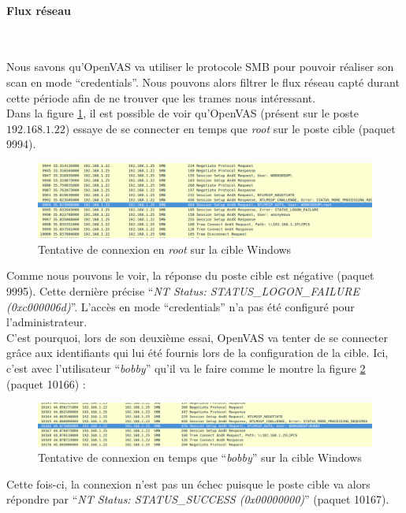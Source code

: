 \paragraph{Flux réseau}~\\\par
Nous savons qu'OpenVAS va utiliser le protocole SMB pour pouvoir réaliser son scan en mode \enquote{credentials}. Nous pouvons alors filtrer le flux réseau capté durant cette période afin de ne trouver que les trames nous intéressant.\\
Dans la figure \ref{fig:1}, il est possible de voir qu'OpenVAS (présent sur le poste $192.168.1.22$) essaye de se connecter en temps que \textit{root} sur le poste cible (paquet 9994).
\begin{figure}[H]
    \centering
    \includegraphics[width=\textwidth]{img/ws1.png}
    \caption{Tentative de connexion en \textit{root} sur la cible Windows}
    \label{fig:1}
\end{figure}
Comme nous pouvons le voir, la réponse du poste cible est négative (paquet 9995). Cette dernière précise \enquote{\textit{NT Status: STATUS\_LOGON\_FAILURE (0xc000006d)}}. L'accès en mode \enquote{credentials} n'a pas été configuré pour l'administrateur.\\
C'est pourquoi, lors de son deuxième essai, OpenVAS va tenter de se connecter grâce aux identifiants qui lui été fournis lors de la configuration de la cible. Ici, c'est avec l'utilisateur \enquote{\textit{bobby}} qu'il va le faire comme le montre la figure \ref{fig:2} (paquet 10166) :
\begin{figure}[H]
    \centering
    \includegraphics[width=\textwidth]{img/ws2.png}
    \caption{Tentative de connexion en temps que \enquote{\textit{bobby}} sur la cible Windows}
    \label{fig:2}
\end{figure}
Cette fois-ci, la connexion n'est pas un échec puisque le poste cible va alors répondre par \enquote{\textit{NT Status: STATUS\_SUCCESS (0x00000000)}} (paquet 10167). \\
